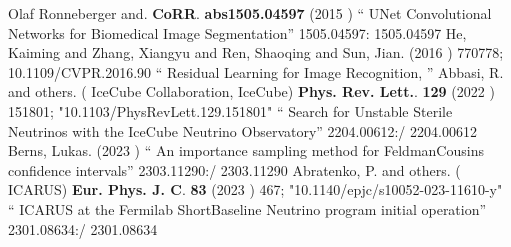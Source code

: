 \documentclass{article}
\begin{document}
\begin{thebibliography}{99}
  Olaf Ronneberger and. {\bf  CoRR}. {\bf  abs1505.04597} (2015 ) `` UNet Convolutional Networks for Biomedical Image Segmentation'' 1505.04597: 1505.04597
 He, Kaiming and Zhang, Xiangyu and Ren, Shaoqing and Sun, Jian. (2016 ) 770778; {10.1109/CVPR.2016.90} `` Residual Learning for Image Recognition, ''
  Abbasi, R. and others. ( IceCube Collaboration, IceCube) {\bf  Phys. Rev. Lett.}. {\bf  129} (2022 )  151801;  "10.1103/PhysRevLett.129.151801" `` Search for Unstable Sterile Neutrinos with the IceCube Neutrino Observatory'' 2204.00612:/ 2204.00612
  Berns, Lukas. (2023 ) `` An importance sampling method for FeldmanCousins confidence intervals'' 2303.11290:/ 2303.11290
  Abratenko, P. and others. ( ICARUS) {\bf  Eur. Phys. J. C}. {\bf  83} (2023 )  467;  "10.1140/epjc/s10052-023-11610-y" `` ICARUS at the Fermilab ShortBaseline Neutrino program initial operation'' 2301.08634:/ 2301.08634
 
  \end{thebibliography}
\end{document}
